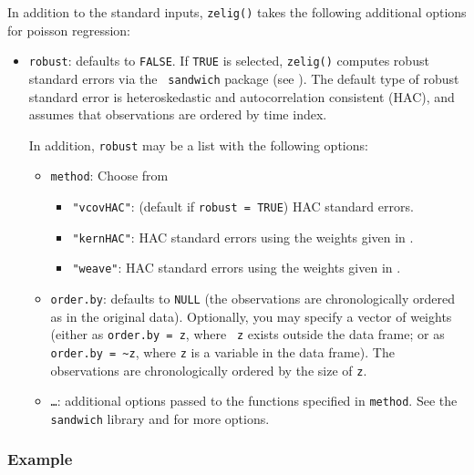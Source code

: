 In addition to the standard inputs, {\tt zelig()} takes the following
additional options for poisson regression:  
\begin{itemize}
\item {\tt robust}: defaults to {\tt FALSE}.  If {\tt TRUE} is
selected, {\tt zelig()} computes robust standard errors via the {\tt
sandwich} package (see \cite{Zeileis04}).  The default type of robust
standard error is heteroskedastic and autocorrelation consistent (HAC),
and assumes that observations are ordered by time index.

In addition, {\tt robust} may be a list with the following options:  
\begin{itemize}
\item {\tt method}:  Choose from 
\begin{itemize}
\item {\tt "vcovHAC"}: (default if {\tt robust = TRUE}) HAC standard
errors. 
\item {\tt "kernHAC"}: HAC standard errors using the
weights given in \cite{Andrews91}. 
\item {\tt "weave"}: HAC standard errors using the
weights given in \cite{LumHea99}.  
\end{itemize}  
\item {\tt order.by}: defaults to {\tt NULL} (the observations are
chronologically ordered as in the original data).  Optionally, you may
specify a vector of weights (either as {\tt order.by = z}, where {\tt
z} exists outside the data frame; or as {\tt order.by = \~{}z}, where
{\tt z} is a variable in the data frame).  The observations are
chronologically ordered by the size of {\tt z}.
\item {\tt \dots}:  additional options passed to the functions 
specified in {\tt method}.   See the {\tt sandwich} library and
\cite{Zeileis04} for more options.   
\end{itemize}
\end{itemize}

\subsubsection{Example}

